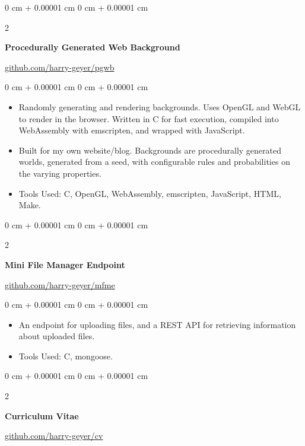\documentclass[10pt, letterpaper]{article}
\newenvironment{highlights}{
    \begin{itemize}[
        topsep=0.10 cm,
        parsep=0.10 cm,
        partopsep=0pt,
        itemsep=0pt,
        leftmargin=0 cm + 10pt
    ]
}{
    \end{itemize}
}
\newenvironment{onecolentry}{
    \begin{adjustwidth}{
        0 cm + 0.00001 cm
    }{
        0 cm + 0.00001 cm
    }
}{
    \end{adjustwidth}
}
\newenvironment{twocolentry}[2][]{
    \onecolentry
    \def\secondColumn{#2}
    \setcolumnwidth{\fill, 4.5 cm}
    \begin{paracol}{2}
}{
    \switchcolumn \raggedleft \secondColumn
    \end{paracol}
    \endonecolentry
}
\begin{document}
        \vspace{0.2 cm}

        \begin{twocolentry}{
            \href{https://github.com/harry-geyer/pgwb}{github.com/harry-geyer/pgwb}
        }
            \textbf{Procedurally Generated Web Background}
        \end{twocolentry}

        \vspace{0.10 cm}
        \begin{onecolentry}
            \begin{highlights}
                \item Randomly generating and rendering backgrounds. Uses OpenGL and WebGL to render in the browser. Written in C for fast execution, compiled into WebAssembly with emscripten, and wrapped with JavaScript.
                \item Built for my own website/blog. Backgrounds are procedurally generated worlds, generated from a seed, with configurable rules and probabilities on the varying properties.
                \item Tools Used: C, OpenGL, WebAssembly, emscripten, JavaScript, HTML, Make.
            \end{highlights}
        \end{onecolentry}

        \vspace{0.2 cm}

        \begin{twocolentry}{
            \href{https://github.com/harry-geyer/mfme}{github.com/harry-geyer/mfme}
        }
            \textbf{Mini File Manager Endpoint}
        \end{twocolentry}

        \vspace{0.10 cm}
        \begin{onecolentry}
            \begin{highlights}
                \item An endpoint for uploading files, and a REST API for retrieving information about uploaded files.
                \item Tools Used: C, mongoose.
            \end{highlights}
        \end{onecolentry}

        \vspace{0.2 cm}

        \begin{twocolentry}{
            \href{https://github.com/harry-geyer/cv}{github.com/harry-geyer/cv}
        }
            \textbf{Curriculum Vitae}
        \end{twocolentry}
\end{document}
